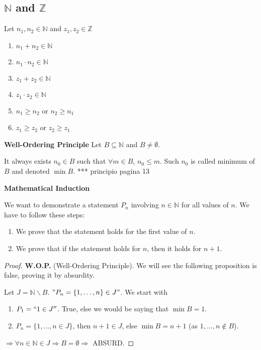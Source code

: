 \documentclass[12pt, a4paper]{book}
\begin{document}
\subsection{$\mathbb{N}$ and $\mathbb{Z}$}

\begin{prop}
  Let $n_1, n_2 \in \mathbb{N}$ and $z_1, z_2 \in \mathbb{Z}$
  \begin{enumerate}[label=\emph{\alph*})]
    \item $n_1 + n_2 \in \mathbb{N}$
    \item $n_1 \cdot n_2 \in \mathbb{N}$
    \item $z_1 + z_2 \in \mathbb{N}$
    \item $z_1 \cdot z_2 \in \mathbb{N}$
    \item $n_1 \geq n_2$ or $n_2 \geq n_1$
    \item $z_1 \geq z_2$ or $z_2 \geq z_1$
  \end{enumerate}
\end{prop}

\begin{prop}
  \textbf{Well-Ordering Principle}
  \boldmath
  Let $B \subseteq \mathbb{N}$ and $B \neq \emptyset$.

  It always exists $n_0 \in B$ such that $\forall m\in B$, $n_0 \leq m$. Such $n_0$ is called minimum of $B$ and denoted $\min B$.
  *** principio pagina 13
  \unboldmath
\end{prop}

\begin{defn}
  \textbf{Mathematical Induction}

  We want to demonstrate a statement $P_n$ involving $n\in\mathbb{N}$ for all values of $n$. We have to follow these steps:
  \begin{enumerate}[label=\emph{\alph*})]
    \item We prove that the statement holds for the first value of $n$.
    \item We prove that if the statement holds for $n$, then it holds for $n+1$.
  \end{enumerate}
\end{defn}

\begin{exmp}
  \begin{proof}
    \textbf{W.O.P.} (Well-Ordering Principle). We will see the following proposition is false, proving it by absurdity.

    Let $J = \mathbb{N} \backslash B$. $"P_n = \{1,\ldots,n\} \in J"$. We start with
    \begin{enumerate}[label=\emph{\alph*})]
      \item $P_1 = ``1 \in J''$. True, else we would be saying that $\min B = 1$.
      \item $P_n = \{1,\ldots,n \in J\}$, then $n+1 \in J$, else $\min B = n+1$ (as $1,\ldots,n \notin B$).
    \end{enumerate}
    $\Rightarrow \forall n\in\mathbb{N}\in J \Rightarrow B = \emptyset \Rightarrow$ ABSURD.
  \end{proof}
\end{exmp}
\end{document}
